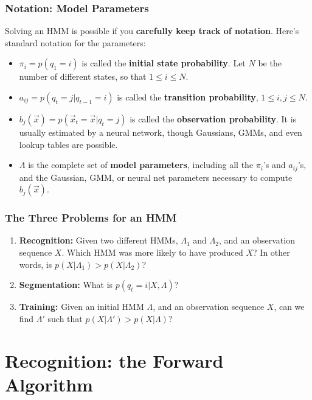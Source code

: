 \documentclass{beamer}
\begin{document}
\begin{frame}
  \frametitle{Notation: Model Parameters}

  Solving an HMM is possible if you {\bf carefully keep track of
  notation}.  Here's standard notation for the parameters:
  \begin{itemize}
  \item $\pi_i = p(q_1=i)$ is called the {\bf initial state probability}.
    Let $N$ be the number of different states, so that $1\le i\le N$.
  \item $a_{ij} = p(q_t=j|q_{t-1}=i)$ is called the {\bf transition
    probability}, $1\le i,j\le N$.
  \item $b_j(\vec{x}) = p(\vec{x}_t=\vec{x}|q_t=j)$ is called the
    {\bf observation probability}.  It is usually estimated by
    a neural network, though Gaussians, GMMs, and even lookup tables
    are possible.
  \item $\Lambda$ is the complete set of {\bf model parameters},
    including all the $\pi_i$'s and $a_{ij}$'s, and the Gaussian, GMM,
    or neural net parameters necessary to compute $b_j(\vec{x})$.
  \end{itemize}
\end{frame}

\begin{frame}
  \frametitle{The Three Problems for an HMM}

  \begin{enumerate}
  \item {\bf Recognition:} Given two different HMMs, $\Lambda_1$ and
    $\Lambda_2$, and an observation sequence $X$.  Which HMM was more
    likely to have produced $X$?  In other words, 
    is $p(X|\Lambda_1)>p(X|\Lambda_2)$?
  \item {\bf Segmentation:} What is $p(q_t=i|X,\Lambda)$?
  \item {\bf Training:} Given an initial HMM $\Lambda$, and an
    observation sequence $X$, can we find $\Lambda'$ such that
    $p(X|\Lambda') > p(X|\Lambda)$?
  \end{enumerate}
\end{frame}

\section[Recognition]{Recognition: the Forward Algorithm}
\setcounter{subsection}{1}
\end{document}
